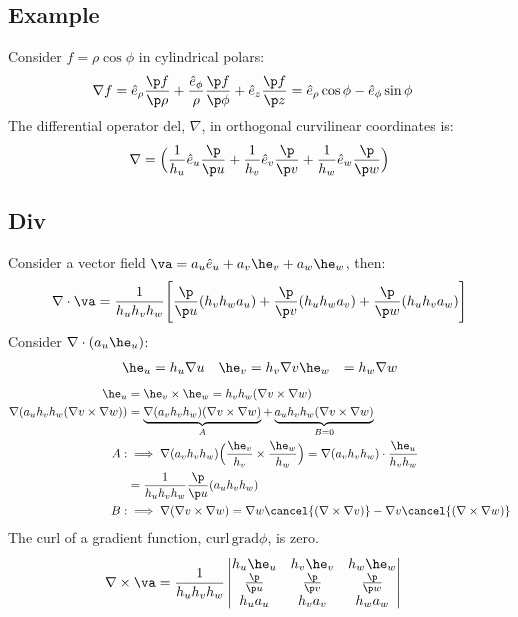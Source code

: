 \documentclass[a4paper, 11pt, normalem]{report}
\begin{document}
\subsection{Example}
Consider $f = \rho\cos\phi$ in cylindrical polars:
\begin{align*}
    \nabla f &= \hat{e}_\rho \frac{\p f}{\p \rho} + \frac{\hat{e}_\phi}{\rho} \frac{\p f}{\p \phi} + \hat{e}_z \frac{\p f}{\p z} = \hat{e}_\rho \cos\phi - \hat{e}_\phi \sin\phi
\end{align*}
The differential operator del, $\nabla$, in orthogonal curvilinear coordinates is:
\begin{equation*}
    \nabla = \Big(\frac{1}{h_u}\hat{e}_u \frac{\p}{\p u} + \frac{1}{h_v} \hat{e}_v \frac{\p}{\p v} + \frac{1}{h_w}\hat{e}_w \frac{\p}{\p w}\Big)
\end{equation*}

\subsection{Div}
Consider a vector field $\va = a_u \hat{e}_u + a_v\he_v + a_w\he_w$, then:
\begin{equation*}
    \nabla \cdot \va = \frac{1}{h_u h_v h_w}\Bigg[\frac{\p}{\p u}(h_v h_w a_u) + \frac{\p}{\p v}(h_u h_w a_v) + \frac{\p}{\p w}(h_u h_v a_w)\Bigg]
\end{equation*}
Consider $\nabla \cdot (a_u \he_u)$:
\begin{align*}
    \he_u &= h_u \nabla u & \he_v = h_v \nabla v & \he_w &= h_w \nabla w
\end{align*}
\begin{align*}
    \he_u &= \he_v \times \he_w = h_vh_w (\nabla v \times \nabla w) \\
    \nabla (a_u h_v h_w (\nabla v \times \nabla w)) &= \underbrace{\nabla(a_v h_v h_w)(\nabla v \times \nabla w)}_{A} + \underbrace{a_u h_v h_w (\nabla v \times \nabla w)}_{B = 0} \\
    A: &\implies \nabla (a_v h_v h_w)\Big(\frac{\he_v}{h_v} \times \frac{\he_w}{h_w}\Big) = \nabla (a_v h_v h_w)\cdot \frac{\he_u}{h_v h_w} \\
    &= \frac{1}{h_u h_v h_w}\frac{\p}{\p u}(a_u h_v h_w) \\
    B: &\implies \nabla (\nabla v \times \nabla w) = \nabla w \cancel{(\nabla \times \nabla v)} - \nabla v \cancel{(\nabla \times \nabla w)}
\end{align*}
The curl of a gradient function, $\text{curl}\,\text{grad}\phi$, is zero.
\begin{align*}
    \nabla \times \va &= \frac{1}{h_u h_v h_w} \begin{vmatrix} h_u \he_u & h_v\he_v & h_w\he_w \\ \frac{\p}{\p u} & \frac{\p}{\p v} & \frac{\p}{\p w} \\ h_u a_u & h_v a_v & h_w a_w \end{vmatrix}
\end{align*}


\end{document}

